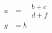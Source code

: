\begin{align}
  a & = \begin{aligned}
          & b + c \\
          & d + f
        \end{aligned} \\
  g & = h
\end{align}
